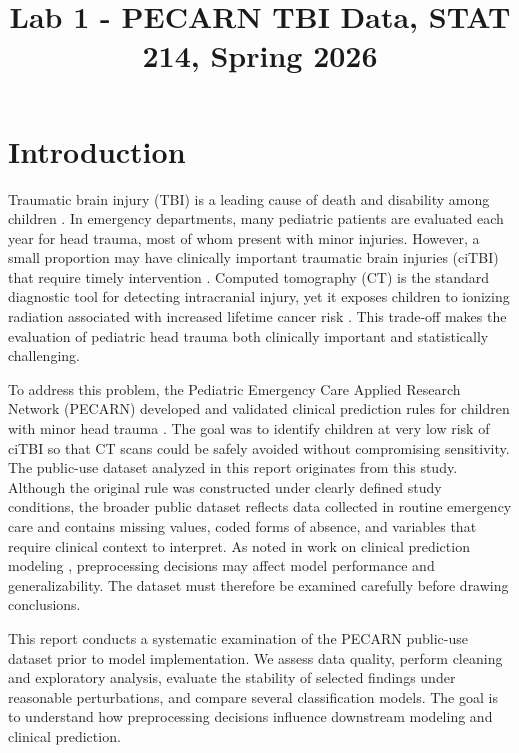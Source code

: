 \documentclass[11pt,letterpaper]{article}
\title{Lab 1 - PECARN TBI Data, STAT 214, Spring 2026}
\author{}
\begin{document}
\maketitle

\section{Introduction}\label{introduction}

Traumatic brain injury (TBI) is a leading cause of death and disability among children \citep{langlois2005traumatic}. In emergency departments, many pediatric patients are evaluated each year for head trauma, most of whom present with minor injuries. However, a small proportion may have clinically important traumatic brain injuries (ciTBI) that require timely intervention \citep{schunk1996utility}. Computed tomography (CT) is the standard diagnostic tool for detecting intracranial injury, yet it exposes children to ionizing radiation associated with increased lifetime cancer risk \citep{brenner2007computed}. This trade-off makes the evaluation of pediatric head trauma both clinically important and statistically challenging.

To address this problem, the Pediatric Emergency Care Applied Research Network (PECARN) developed and validated clinical prediction rules for children with minor head trauma \citep{kuppermann2009identification}. The goal was to identify children at very low risk of ciTBI so that CT scans could be safely avoided without compromising sensitivity. The public-use dataset analyzed in this report originates from this study. Although the original rule was constructed under clearly defined study conditions, the broader public dataset reflects data collected in routine emergency care and contains missing values, coded forms of absence, and variables that require clinical context to interpret. As noted in work on clinical prediction modeling \citep{riley2023stability}, preprocessing decisions may affect model performance and generalizability. The dataset must therefore be examined carefully before drawing conclusions.

This report conducts a systematic examination of the PECARN public-use dataset prior to model implementation. We assess data quality, perform cleaning and exploratory analysis, evaluate the stability of selected findings under reasonable perturbations, and compare several classification models. The goal is to understand how preprocessing decisions influence downstream modeling and clinical prediction.
\end{document}
